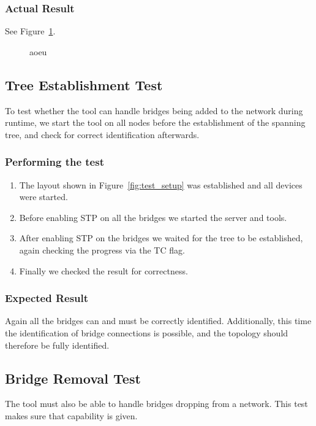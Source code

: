 \subsubsection*{Actual Result}
See Figure~\ref{fig:pnp}.
\begin{figure}[h]
    
    \caption{aoeu}
    \label{fig:pnp}
\end{figure}

\subsection*{Tree Establishment Test}
\label{tree_est_test}
To test whether the tool can handle bridges being added to the network during runtime, we start the tool on all nodes before the establishment of the spanning tree, and check for correct identification afterwards.

\subsubsection*{Performing the test}
\begin{enumerate}
    \item The layout shown in Figure~\ref{fig:test_setup} was established and all devices were started.
    \item Before enabling STP on all the bridges we started the server and tools.
    \item After enabling STP on the bridges we waited for the tree to be established, again checking the progress via the TC flag.
    \item Finally we checked the result for correctness.
\end{enumerate}

\subsubsection*{Expected Result}
Again all the bridges can and must be correctly identified.
Additionally, this time the identification of bridge connections is possible, and the topology should therefore be fully identified.

\subsection*{Bridge Removal Test}
\label{removal_test}
The tool must also be able to handle bridges dropping from a network.
This test makes sure that capability is given.

